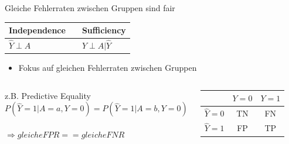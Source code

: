 \documentclass[aspectratio=169]{beamer}
\begin{document}
\begin{frame}[t]{Gleiche Fehlerraten zwischen Gruppen sind fair}
	\vspace*{0.3cm} %
	\begin{table}
        \begin{tabular}{lll}
            \toprule
            Independence & \color{orange}{Separation} & Sufficiency \\
            \midrule
            $\hat{Y} \perp A$ & \color{orange}{$\hat{Y} \perp A | Y$} & $Y \perp A | \hat{Y}$\\
            \bottomrule
        \end{tabular}
    \end{table}
	\begin{itemize}
		\item Fokus auf gleichen Fehlerraten zwischen Gruppen
	\end{itemize}
	\begin{columns}
		\centering
		z.B. Predictive Equality
		$$P(\hat{Y} = 1 | A = a, Y = 0) = P(\hat{Y} = 1 | A = b, Y = 0)$$\\
		$\Rightarrow gleiche FPR == gleiche FNR$
		\begin{center}
			\renewcommand{\arraystretch}{1.5}  %
			\begin{tabular}{c|c|c|}
				& \color{orange}\(Y = 0\) & \color{orange}\(Y = 1\) \\
				\hline
				\(\hat{Y} = 0\) & TN & FN \\
				\hline
				\(\hat{Y} = 1\) & FP & TP \\
				\hline
			\end{tabular}
		\end{center}
	\end{columns}
\end{frame}
\end{document}

